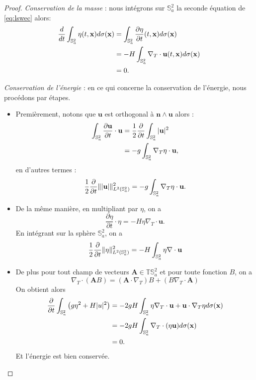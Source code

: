\begin{proof}
\textit{Conservation de la masse} :
nous intégrons sur $\mathbb{S}_a^2$ la seconde équation de \eqref{eq:lswec} alors:
\begin{align*}
\dfrac{d}{dt} \displaystyle\int_{\mathbb{S}_a^2} \eta(t,\mathbf{x})d\sigma(\mathbf{x}) & = \displaystyle\int_{\mathbb{S}_a^2} \dfrac{\partial \eta}{\partial t}(t,\mathbf{x})d\sigma(\mathbf{x})\\
	& = - H \displaystyle\int_{\mathbb{S}_a^2} \nabla_T \cdot \mathbf{u}(t,\mathbf{x}) d \sigma(\mathbf{x}) \\
	& = 0.
\end{align*}

\textit{Conservation de l'énergie}  :
en ce qui concerne la conservation de l'énergie, nous procédons par étapes.
\begin{itemize}
\item Premièrement, notons que $\mathbf{u}$ est orthogonal à $\mathbf{n} \wedge \mathbf{u}$ alors :
\begin{align*}
\displaystyle\int_{\mathbb{S}_a^2} \dfrac{\partial \mathbf{u}}{\partial t} \cdot \mathbf{u} & = \dfrac{1}{2} \dfrac{\partial}{\partial t} \displaystyle\int_{\mathbb{S}_a^2} |\mathbf{u}|^2 \\
	& = -g \displaystyle\int_{\mathbb{S}_a^2} \nabla_T \eta \cdot \mathbf{u},
\end{align*}
en d'autres termes :
\begin{equation}
\dfrac{1}{2} \dfrac{\partial}{\partial t} \| |\mathbf{u}| \|_{L^2(\mathbb{S}_a^2)}^2 = -g \displaystyle\int_{\mathbb{S}_a^2} \nabla_T \eta \cdot \mathbf{u}.
\label{energy_eq1}
\end{equation}
\item De la même manière, en multipliant par $\eta$, on a
\begin{equation}
\dfrac{\partial \eta}{\partial t} \cdot \eta = -H \eta \nabla_T \cdot \mathbf{u}.
\end{equation}
En intégrant sur la sphère $\mathbb{S}_a^2$, on a
\begin{equation}
\dfrac{1}{2} \dfrac{\partial}{\partial t} \| \eta \|^2_{L^2(\mathbb{S}_a^2)} = -H \displaystyle\int_{\mathbb{S}_a^2} \eta \nabla \cdot \mathbf{u}
\label{energy_eq2}
\end{equation}
\item De plus pour tout champ de vecteurs $\mathbf{A} \in \mathbb{T}\mathbb{S}_a^2$ et pour toute fonction $B$, on a
\begin{equation}
\nabla_T \cdot \left( \mathbf{A} B \right) = \left( \mathbf{A} \cdot \nabla_T \right) B + \left( B \nabla_T \cdot \mathbf{A} \right)
\label{energy_eq3}
\end{equation}
On obtient alors
\begin{align*}
\dfrac{\partial}{\partial t} \displaystyle\int_{\mathbb{S}^2_a} \left( g  \eta^2 + H | u |^2 \right) & = -2 gH \displaystyle\int_{\mathbb{S}_a^2} \eta \nabla_T \cdot \mathbf{u} + \mathbf{u} \cdot \nabla_T \eta d \sigma(\mathbf{x}) \\
	& = -2 g H\displaystyle\int_{\mathbb{S}_a^2} \nabla_T \cdot (\eta \mathbf{u}) d \sigma(\mathbf{x}) \\
	& = 0.
\end{align*}
Et l'énergie est bien conservée.
\end{itemize}
\end{proof}
